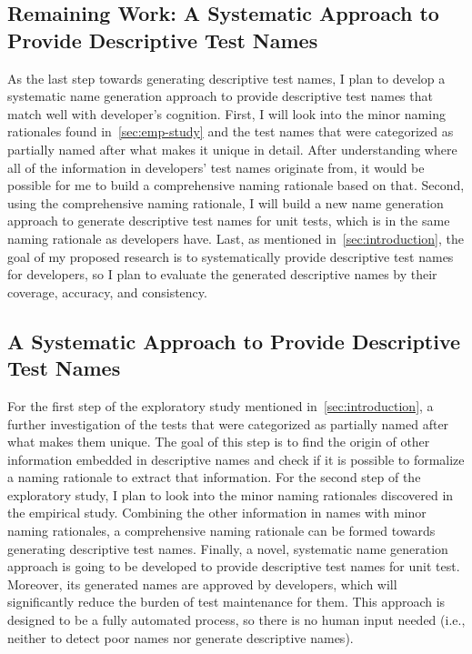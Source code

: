 \subsection{Remaining Work: A Systematic Approach to Provide Descriptive Test Names}
\label{sec:remaining-work}

As the last step towards generating descriptive test names, I plan to develop a systematic name generation approach to provide descriptive test names that match well with developer's cognition.
%
First, I will look into the minor naming rationales found in~\cref{sec:emp-study} and the test names that were categorized as partially named after what makes it unique in detail.
%
After understanding where all of the information in developers' test names originate from, it would be possible for me to build a comprehensive naming rationale based on that.
%
Second, using the comprehensive naming rationale, I will build a new name generation approach to generate descriptive test names for unit tests, which is in the same naming rationale as developers have.
%
Last, as mentioned in~\cref{sec:introduction}, the goal of my proposed research is to systematically provide descriptive test names for developers, so I plan to evaluate the generated descriptive names by their coverage, accuracy, and consistency.


\subsection{A Systematic Approach to Provide Descriptive Test Names}

For the first step of the exploratory study mentioned in~\cref{sec:introduction}, a further investigation of the tests that were categorized as partially named after what makes them unique.
%
The goal of this step is to find the origin of other information embedded in descriptive names and check if it is possible to formalize a naming rationale to extract that information.
%
For the second step of the exploratory study, I plan to look into the minor naming rationales discovered in the empirical study.
%
Combining the other information in names with minor naming rationales, a comprehensive naming rationale can be formed towards generating descriptive test names.
%
Finally, a novel, systematic name generation approach is going to be developed to provide descriptive test names for unit test.
%
Moreover, its generated names are approved by developers, which will significantly reduce the burden of test maintenance for them.
%
This approach is designed to be a fully automated process, so there is no human input needed (i.e., neither to detect poor names nor generate descriptive names).


